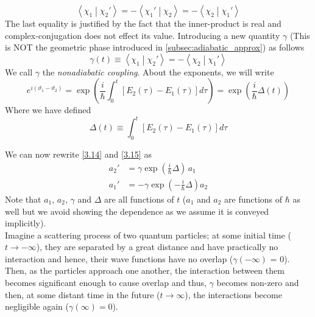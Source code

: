 \documentclass[12pt,a4paper]{article}
\begin{document}
	\begin{equation}
		\left\langle \chi_{1} \middle| \chi_{2}' \right\rangle = - \left\langle \chi_{1}' \middle| \chi_{2} \right\rangle = - \left\langle \chi_{2} \middle| \chi_{1}' \right\rangle
	\end{equation}
	The last equality is justified by the fact that the inner-product is real and complex-conjugation does not effect its value. Introducing a new quantity $\gamma$ (This is NOT the geometric phase introduced in \ref{subsec:adiabatic_approx}) as follows
	\begin{equation}
		\boxed{\gamma(t) \equiv \left\langle \chi_{1} \middle| \chi_{2}' \right\rangle = - \left\langle \chi_{2} \middle| \chi_{1}' \right\rangle} \label{3.19}
	\end{equation}
	We call $\gamma$ the \emph{nonadiabatic coupling}. About the exponents, we will write
	\begin{equation}
		e^{i \left( \vartheta_{1}- \vartheta_{2}\right)} = \exp\left( \dfrac{i}{\hbar} \int_{0}^{t} \left[ E_{2}(\tau) - E_{1}(\tau) \right] d\tau \right) = \exp\left( \dfrac{i}{\hbar} \Delta(t) \right)
	\end{equation}
	Where we have defined 
	\begin{equation}
		\boxed{\Delta(t) \equiv \int_{0}^{t} \left[ E_{2}(\tau) - E_{1}(\tau) \right] d\tau} \label{3.21}
	\end{equation}
	
	We can now rewrite \eqref{3.14} and \eqref{3.15} as
	\begin{align}
		a_{2}' &= \gamma \exp\left( \frac{i}{\hbar} \Delta \right) \, a_{1} \label{3.22} \\
		a_{1}' &= - \gamma \exp\left( - \frac{i}{\hbar} \Delta \right) a_{2} \label{3.23}
	\end{align}
	Note that $a_{1}$, $a_{2}$, $\gamma$ and $\Delta$ are all functions of $t$ ($a_{1}$ and $a_{2}$ are functions of $\hbar$ as well but we avoid showing the dependence as we assume it is conveyed implicitly). \\[10pt]
	
	Imagine a scattering process of two quantum particles; at some initial time ($ t \rightarrow -\infty$), they are separated by a great distance and have practically no interaction and hence, their wave functions have no overlap ($\gamma(-\infty)$ = 0). Then, as the particles approach one another, the interaction between them becomes significant enough to cause overlap and thus, $\gamma$ becomes non-zero and then, at some distant time in the future ($t \rightarrow \infty$), the interactions become negligible again ($\gamma(\infty) = 0$).
	
\end{document}
